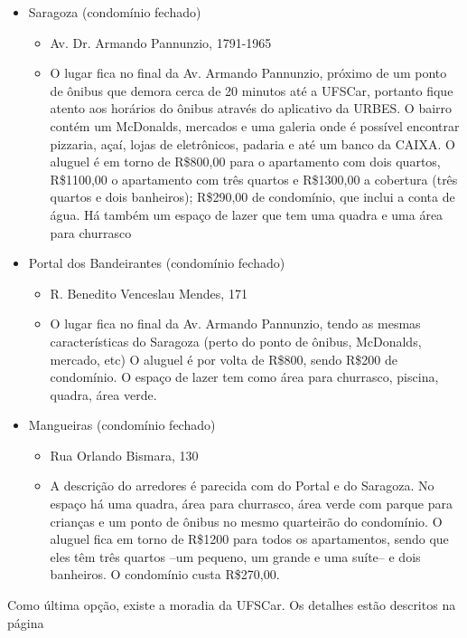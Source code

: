 \begin{itemize}
  \item Saragoza (condomínio fechado)
    \begin{itemize}
      \item Av. Dr. Armando Pannunzio, 1791-1965
      \item{O lugar fica no final da Av. Armando Pannunzio, próximo de um ponto de ônibus que demora cerca de 20 minutos até a UFSCar, portanto fique atento aos horários do ônibus através do aplicativo da URBES. O bairro contém um McDonalds, mercados e uma galeria onde é possível encontrar pizzaria, açaí, lojas de eletrônicos, padaria e até um banco da CAIXA.
	      O aluguel é em torno de R\$800,00 para o apartamento com dois quartos, R\$1100,00 o apartamento com três quartos e R\$1300,00 a cobertura (três quartos e dois banheiros); R\$290,00 de condomínio, que inclui a conta de água. Há também um espaço de lazer que tem uma quadra e uma área para churrasco}
    \end{itemize}

  \item Portal dos Bandeirantes (condomínio fechado)
    \begin{itemize}
      \item R. Benedito Venceslau Mendes, 171
      \item O lugar fica no final da Av. Armando Pannunzio, tendo as mesmas características do Saragoza (perto do ponto de ônibus, McDonalds, mercado, etc) O aluguel é por volta de R\$800, sendo R\$200 de condomínio. O espaço de lazer tem como área para churrasco, piscina, quadra, área verde.
    \end{itemize}

  \item Mangueiras (condomínio fechado)
    \begin{itemize}
      \item Rua Orlando Bismara, 130
      \item A descrição do arredores é parecida com do Portal e do Saragoza. No espaço há uma quadra, área para churrasco, área verde com parque para crianças e um ponto de ônibus no mesmo quarteirão do condomínio. O aluguel fica em torno de R\$1200 para todos os apartamentos, sendo que eles têm três quartos --um pequeno, um grande e uma suíte-- e dois banheiros. O condomínio custa R\$270,00.
    \end{itemize}
\end{itemize}

Como última opção, existe a moradia da UFSCar. Os detalhes estão descritos na página \pageref{moradia}

